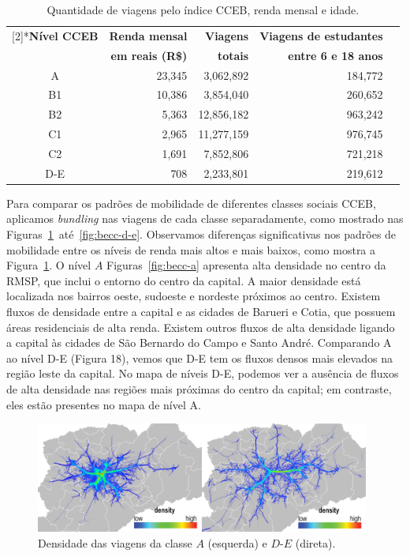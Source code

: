\begin{table}[!htb]
  \small
  \newcommand{\hdr}[1]{\bfseries#1}
  \centering
  \caption{Quantidade de viagens pelo índice CCEB, renda mensal e idade.\label{tab:becc}}
  \begin{tabular}{>{\footnotesize}c>{\footnotesize}r>{\footnotesize}r>{\footnotesize}r>{\footnotesize}r}
    \toprule
    \multirow{2}[2]{*}{\hdr{Nível CCEB}} & \hdr{Renda mensal} & \hdr{Viagens} & \hdr{Viagens de estudantes}\\
    & \hdr{em reais (R\$)} & \hdr{totais} & \hdr{entre 6 e 18 anos}\\
    \midrule
    A   & 23,345    & 3,062,892  &   184,772\\
    B1  & 10,386    & 3,854,040  &   260,652\\
    B2  & 5,363     & 12,856,182 &   963,242\\
    C1  & 2,965     & 11,277,159 &   976,745\\
    C2  & 1,691     & 7,852,806  &   721,218\\
    D-E & 708       & 2,233,801  &   219,612\\
    \bottomrule
  \end{tabular}
\end{table}

Para comparar os padrões de mobilidade de diferentes classes sociais CCEB,
aplicamos \emph{bundling} nas viagens de cada classe separadamente, como
mostrado nas Figuras~\ref{fig:becc-axd-e}~até~\ref{fig:becc-d-e}. Observamos
diferenças significativas nos padrões de mobilidade entre os níveis de renda
mais altos e mais baixos, como mostra a Figura~\ref{fig:becc-axd-e}. O nível $A$
Figuras~\ref{fig:becc-a} apresenta alta densidade no centro da RMSP, que inclui
o entorno do centro da capital. A maior densidade está localizada nos bairros
oeste, sudoeste e nordeste próximos ao centro. Existem fluxos de densidade entre
a capital e as cidades de Barueri e Cotia, que possuem áreas residenciais de
alta renda. Existem outros fluxos de alta densidade ligando a capital às cidades
de São Bernardo do Campo e Santo André. Comparando A ao nível D-E (Figura 18),
vemos que D-E tem os fluxos densos mais elevados na região leste da capital. No
mapa de níveis D-E, podemos ver a ausência de fluxos de alta densidade nas
regiões mais próximas do centro da capital; em contraste, eles estão presentes
no mapa de nível A.

\begin{figure}[!htb]
  \centering
  \captionsetup{justification=centering}
  \includegraphics[width=0.98\textwidth]{../figuras/comparison-axd-e-strata-leg.png}
  \caption{Densidade das viagens da classe $A$ (esquerda) e $D$-$E$ (direta). \label{fig:becc-axd-e}}
\end{figure}

